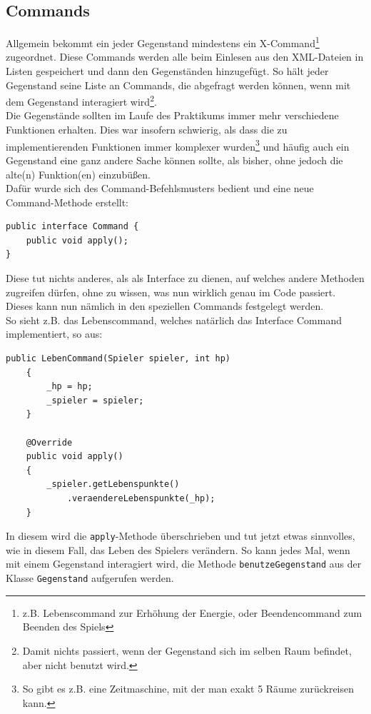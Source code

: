 \documentclass[12pt,twoside]{article}
\theoremstyle{plain}
\theoremstyle{definition}
\theoremstyle{remark}
\begin{document}
\subsection{Commands}
\label{ssec:main_commands}
Allgemein bekommt ein jeder Gegenstand mindestens ein X-Command\footnote{z.B. Lebenscommand zur Erhöhung der Energie, oder Beendencommand zum Beenden des Spiels} zugeordnet.
Diese Commands werden alle beim Einlesen aus den XML-Dateien in Listen gespeichert und dann den Gegenständen hinzugefügt.
So hält jeder Gegenstand seine Liste an Commands, die abgefragt werden können, wenn mit dem Gegenstand interagiert wird\footnote{Damit nichts passiert, wenn der Gegenstand sich im selben Raum befindet, aber nicht benutzt wird.}.\\
Die Gegenstände sollten im Laufe des Praktikums immer mehr verschiedene Funktionen erhalten.
Dies war insofern schwierig, als dass die zu implementierenden Funktionen immer komplexer wurden\footnote{So gibt es z.B. eine Zeitmaschine, mit der man exakt 5 Räume zurückreisen kann.} und häufig auch ein Gegenstand eine ganz andere Sache können sollte, als bisher, ohne jedoch die alte(n) Funktion(en) einzubüßen.\\
Dafür wurde sich des Command-Befehlsmusters bedient und eine neue Command-Methode erstellt:
\begin{lstlisting}[caption=Unser Command-Interface, label=code:main_command]
public interface Command {
	public void apply();
}
\end{lstlisting}
Diese tut nichts anderes, als als Interface zu dienen, auf welches andere Methoden zugreifen dürfen, ohne zu wissen, was nun wirklich genau im Code passiert.
Dieses kann nun nämlich in den speziellen Commands festgelegt werden.
\\
So sieht z.B. das Lebenscommand, welches natärlich das Interface Command implementiert, so aus:
\begin{lstlisting}[caption=LebenCommand - eine implementation des Command-Interfaces, label=code:main_lebencommand]
public LebenCommand(Spieler spieler, int hp)
    {
        _hp = hp;
        _spieler = spieler;
    }

    @Override
    public void apply()
    {
        _spieler.getLebenspunkte()
            .veraendereLebenspunkte(_hp);
    }
\end{lstlisting}
In diesem wird die \texttt{apply}-Methode überschrieben und tut jetzt etwas sinnvolles, wie in diesem Fall, das Leben des Spielers verändern.
So kann jedes Mal, wenn mit einem Gegenstand interagiert wird, die Methode \texttt{benutzeGegenstand} aus der Klasse \texttt{Gegenstand} aufgerufen werden.
\end{document}
